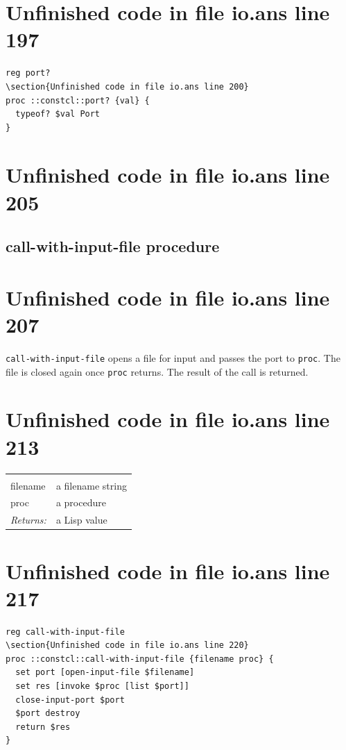 \documentclass[twoside,9pt]{report}
\begin{document}
\section{Unfinished code in file io.ans line 197}
\begin{lstlisting}
reg port?
\section{Unfinished code in file io.ans line 200}
proc ::constcl::port? {val} {
  typeof? $val Port
}
\end{lstlisting}
\section{Unfinished code in file io.ans line 205}
\subsection{call-with-input-file procedure}
\label{call-with-input-file-procedure}
\section{Unfinished code in file io.ans line 207}


\texttt{call-with-input-file} opens a file for input and passes the port to \texttt{proc}. The file is closed again once \texttt{proc} returns. The result of the call is returned.

\section{Unfinished code in file io.ans line 213}
\noindent\begin{tabular}{ |p{1.9cm} p{8cm}| }
\hline
\rowcolor[HTML]{CCCCCC} \multicolumn{2}{|l|}{\bf call-with-input-file (public)} \\
filename & a filename string \\
proc & a procedure \\
\textit{Returns:} & a Lisp value \\
\hline
\end{tabular}
\section{Unfinished code in file io.ans line 217}
\begin{lstlisting}
reg call-with-input-file
\section{Unfinished code in file io.ans line 220}
proc ::constcl::call-with-input-file {filename proc} {
  set port [open-input-file $filename]
  set res [invoke $proc [list $port]]
  close-input-port $port
  $port destroy
  return $res
}
\end{lstlisting}
\end{document}

